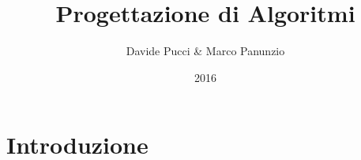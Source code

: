 

\title{Progettazione di Algoritmi}
\author{Davide Pucci \& Marco Panunzio}
\date{2016}



\maketitle

\tableofcontents
\chapter{Introduzione}


